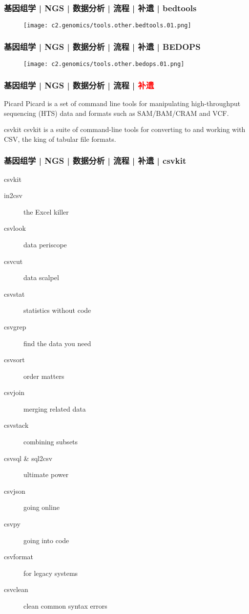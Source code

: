 \begin{frame}
  \frametitle{基因组学 | NGS | 数据分析 | 流程 | 补遗 | bedtools}
  \begin{figure}
    \centering
    \texttt{[image: c2.genomics/tools.other.bedtools.01.png]}
  \end{figure}
\end{frame}

\begin{frame}
  \frametitle{基因组学 | NGS | 数据分析 | 流程 | 补遗 | BEDOPS}
  \begin{figure}
    \centering
    \texttt{[image: c2.genomics/tools.other.bedops.01.png]}
  \end{figure}
\end{frame}

\begin{frame}
  \frametitle{基因组学 | NGS | 数据分析 | 流程 | \textcolor{red}{补遗}}
  \begin{block}{Picard}
    Picard is a set of command line tools for manipulating high-throughput sequencing (HTS) data and formats such as SAM/BAM/CRAM and VCF.
  \end{block}
  \pause
  \begin{block}{csvkit}
    csvkit is a suite of command-line tools for converting to and working with CSV, the king of tabular file formats.
  \end{block}
\end{frame}

\begin{frame}
  \frametitle{基因组学 | NGS | 数据分析 | 流程 | 补遗 | csvkit}
  \begin{block}{csvkit}
    \begin{description}
      \item[in2csv] the Excel killer
      \item[csvlook] data periscope
      \item[csvcut] data scalpel
      \item[csvstat] statistics without code
      \item[csvgrep] find the data you need
      \item[csvsort] order matters
      \item[csvjoin] merging related data
      \item[csvstack] combining subsets
      \item[csvsql \& sql2csv] ultimate power
      \item[csvjson] going online
      \item[csvpy] going into code
      \item[csvformat] for legacy systems
      \item[csvclean] clean common syntax errors
    \end{description}
  \end{block}
\end{frame}

